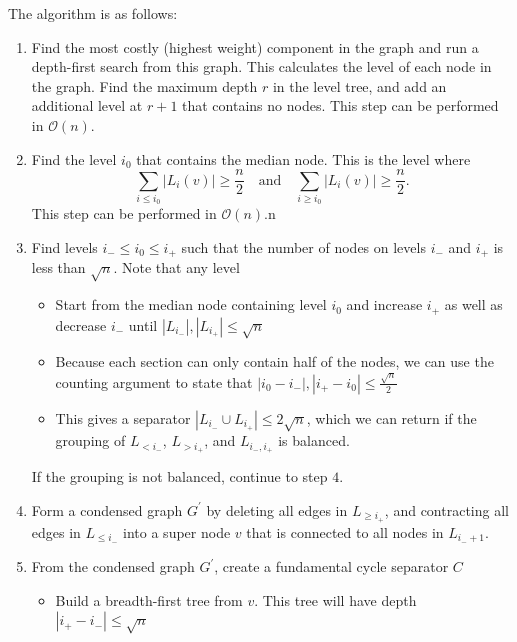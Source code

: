 \documentclass[11pt]{article}
\begin{document}
The algorithm is as follows:
\begin{enumerate}
    
    \item Find the most costly (highest weight) component in the graph and run a depth-first search from this graph. This calculates the level of each node in the graph. Find the maximum depth $r$ in the level tree, and add an additional level at $r+1$ that contains no nodes. This step can be performed in $\mathcal{O}(n)$.
    
    \item Find the level $i_0$ that contains the median node. This is the level where
    \[
    \sum_{i \leq i_0} |L_i(v)| \geq \frac{n}{2} \quad \text{and}\quad \sum_{i \geq i_0} |L_i(v)| \geq \frac{n}{2}.
    \]
    This step can be performed in $\mathcal{O}(n)$.n
    
    \item Find levels $i_- \leq i_0 \leq i_+$ such that the number of nodes on levels $i_-$ and $i_+$ is less than $\sqrt{n}$. Note that any level
    \begin{itemize}
        \item Start from the median node containing level $i_0$ and increase $i_+$ as well as decrease $i_-$ until $|L_{i_-}|,|L_{i_+}| \leq \sqrt{n}$
        
        \item Because each section can only contain half of the nodes, we can use the counting argument to state that $|i_0 - i_-|,|i_+ - i_0| \leq \frac{\sqrt{n}}{2}$
        
        \item This gives a separator $|L_{i_-} \cup L_{i_+}| \leq 2 \sqrt{n}$, which we can return if the grouping of $L_{< i_-}$, $L_{> i_+}$, and $L_{i_-,i_+}$ is balanced.
    \end{itemize}
    If the grouping is not balanced, continue to step $4$.
    
    \item Form a condensed graph $G^{'}$ by deleting  all edges in $L_{\geq i_+}$, and contracting all edges in $L_{\leq i_-}$ into a super node $v$ that is connected to all nodes in $L_{i_- + 1}$.
    
    \item From the condensed graph $G^{'}$, create a fundamental cycle separator $C$
    \begin{itemize}
        \item Build a breadth-first tree from $v$. This tree will have depth $|i_+ - i_-| \leq \sqrt{n}$
        

\end{itemize}
\end{enumerate}
\end{document}
